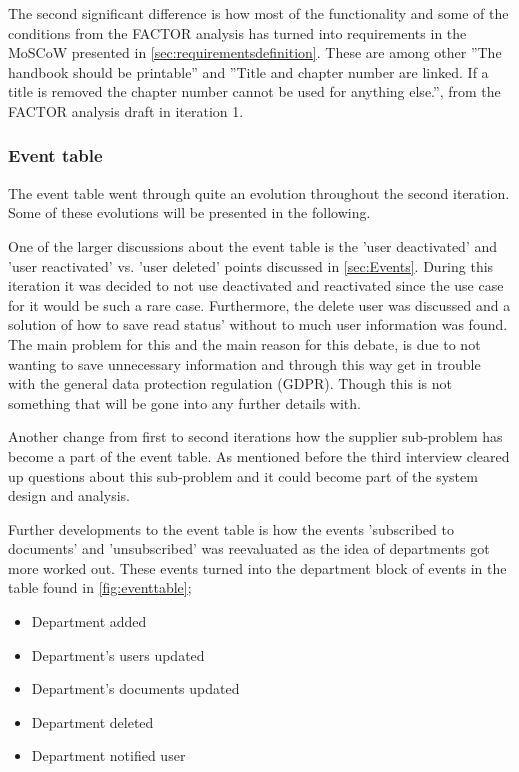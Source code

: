 The second significant difference is how most of the functionality and some of the conditions from the FACTOR analysis has turned into requirements in the MoSCoW presented in \cref{sec:requirementsdefinition}. 
These are among other ''The handbook should be printable'' and ''Title and chapter number are linked. If a title is removed the chapter number cannot be used for anything else.'', from the FACTOR analysis draft in iteration 1.

\subsubsection*{Event table}
The event table went through quite an evolution throughout the second iteration.
Some of these evolutions will be presented in the following.

One of the larger discussions about the event table is the 'user deactivated' and 'user reactivated' vs. 'user deleted' points discussed in \cref{sec:Events}.
During this iteration it was decided to not use deactivated and reactivated since the use case for it would be such a rare case.
Furthermore, the delete user was discussed and a solution of how to save read status' without to much user information was found.
The main problem for this and the main reason for this debate, is due to not wanting to save unnecessary information and through this way get in trouble with the general data protection regulation (GDPR).
Though this is not something that will be gone into any further details with.

Another change from first to second iterations how the supplier sub-problem has become a part of the event table.
As mentioned before the third interview cleared up questions about this sub-problem and it could become part of the system design and analysis.

Further developments to the event table is how the events 'subscribed to documents' and 'unsubscribed' was reevaluated as the idea of departments got more worked out.
These events turned into the department block of events in the table found in \cref{fig:eventtable};
\begin{itemize}
	\item 
	Department added
	\item
	Department's users updated
	\item
	Department's documents updated
	\item
	Department deleted
	\item
	Department notified user
\end{itemize} 

